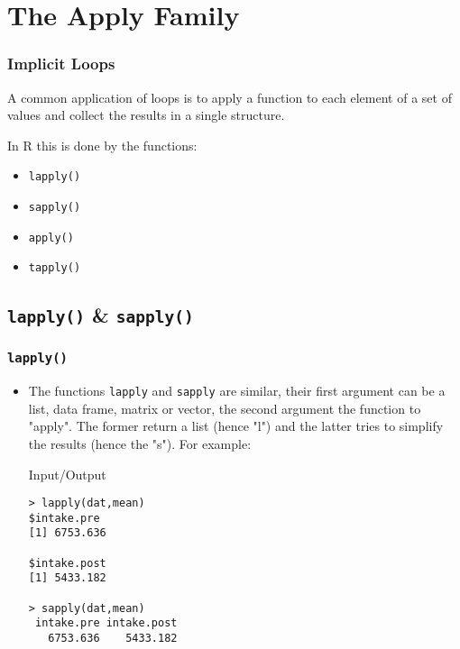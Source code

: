 \documentclass[xcolor={table},c]{beamer}
\begin{document}
\section{The Apply Family}
\begin{frame}[fragile]\frametitle{Implicit Loops}
A common application of loops is  to apply a function to each element of a set of values and
collect the results in a single structure.

In R this is done by the functions:
\begin{itemize}
 \item \texttt{lapply()}
 \item \texttt{sapply()}
 \item \texttt{apply()}
 \item \texttt{tapply()}
\end{itemize}
\end{frame}

\subsection{\texttt{lapply()} \& \texttt{sapply()}}
\begin{frame}[fragile]\frametitle{\texttt{lapply()}}
\begin{itemize}
\item The functions \texttt{lapply} and \texttt{sapply} are similar, their first argument can be a list, data frame, matrix or vector, the second argument the function to "apply". The former return a list (hence "l") and the latter tries to simplify the results (hence the "s").  For example:
\begin{exampleblock}{Input/Output}\small
\begin{verbatim}
> lapply(dat,mean)
$intake.pre
[1] 6753.636

$intake.post
[1] 5433.182

> sapply(dat,mean)
 intake.pre intake.post
   6753.636    5433.182
\end{verbatim}
\end{exampleblock}

\end{itemize}
\end{frame}
\end{document}
